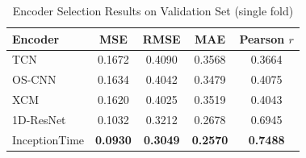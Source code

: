 \documentclass{article}
\begin{document}
\begin{table}[htbp]
\centering
\caption{Encoder Selection Results on Validation Set (single fold)}
\label{tab:encoder_selection}
\begin{tabular}{lcccc}
\toprule
\textbf{Encoder} & \textbf{MSE} & \textbf{RMSE} & \textbf{MAE} & \textbf{Pearson $r$} \\
\midrule
TCN & 0.1672 & 0.4090 & 0.3568 & 0.3664 \\
OS-CNN & 0.1634 & 0.4042 & 0.3479 & 0.4075 \\
XCM & 0.1620 & 0.4025 & 0.3519 & 0.4043 \\
1D-ResNet & 0.1032 & 0.3212 & 0.2678 & 0.6945 \\
InceptionTime & \textbf{0.0930} & \textbf{0.3049} & \textbf{0.2570} & \textbf{0.7488} \\
\bottomrule
\end{tabular}
\end{table}
\end{document}
